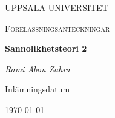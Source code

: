 \begin{titlepage}

  \centering
	{\scshape\LARGE UPPSALA UNIVERSITET\par}
	\vspace{1cm}
  {\scshape\Large {Förelässningsanteckningar} \par}
	\vspace{1.5cm}
  {\huge\bfseries {Sannolikhetsteori 2} \par}
	\vspace{2cm}
	{\Large\itshape Rami Abou Zahra \par}
	\vfill
  \vfill


  {\large Inlämningsdatum}\par
  {\today}

\end{titlepage}
